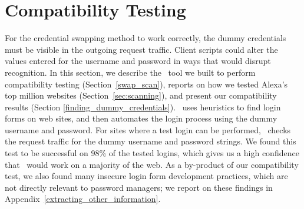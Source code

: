\section{Compatibility Testing} \label{compatibility_testing}\label{sec:compatibility}
For the credential swapping method to work correctly, the dummy credentials must be visible in the outgoing request traffic.  Client scripts could alter the values entered for the username and password in ways that would disrupt recognition. In this section, we describe the \SwapScan\ tool we built to perform compatibility testing (Section~\ref{swap_scan}), reports on how we tested Alexa's top million websites (Section~\ref{sec:scanning}), and present our compatibility results (Section \ref{finding_dummy_credentials}).  \SwapScan\ uses heuristics to find login forms on web sites, and then automates the login process using the dummy username and password. For sites where a test login can be performed, \SwapScan\ checks the request traffic for the dummy username and password strings. We found this test to be successful on 98\% of the tested logins, which gives us a high confidence that \SecPass\ would work on a majority of the web. As a by-product of our compatibility test, we also found many insecure login form development practices, which are not directly relevant to password managers; we report on these findings in Appendix~\ref{extracting_other_information}. 




